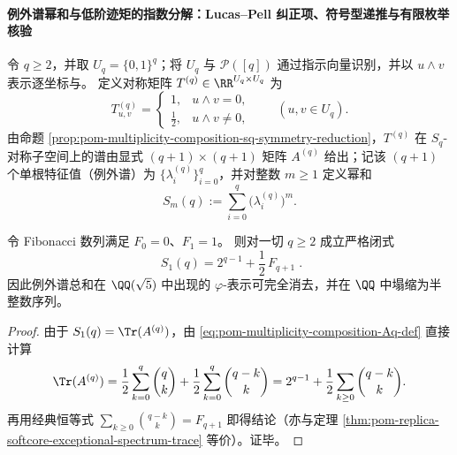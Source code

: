 \paragraph{例外谱幂和与低阶迹矩的指数分解：Lucas--Pell 纠正项、符号型递推与有限枚举核验}
令 \(q\ge 2\)，并取 \(U_q=\{0,1\}^q\)；将 \(U_q\) 与 \(\mathcal P([q])\) 通过指示向量识别，并以 \(u\wedge v\) 表示逐坐标与。
定义对称矩阵 \(T^{(q)}\in\RR^{U_q\times U_q}\) 为
\[
T^{(q)}_{u,v}=
\begin{cases}
1,&u\wedge v=0,\\[2pt]
\frac12,&u\wedge v\neq 0,
\end{cases}
\qquad (u,v\in U_q).
\]
由命题 \ref{prop:pom-multiplicity-composition-sq-symmetry-reduction}，\(T^{(q)}\) 在 \(S_q\)-对称子空间上的谱由显式 \((q+1)\times(q+1)\) 矩阵 \(A^{(q)}\) 给出；记该 \((q+1)\) 个单根特征值（例外谱）为 \(\{\lambda_i^{(q)}\}_{i=0}^{q}\)，并对整数 \(m\ge 1\) 定义幂和
\[
S_m(q):=\sum_{i=0}^{q}\big(\lambda_i^{(q)}\big)^m.
\]

\begin{conclusion}[例外谱一次幂和的整系数塌缩：\texorpdfstring{$S_1(q)=2^{q-1}+\frac12F_{q+1}$}{S1(q)=2^{q-1}+1/2 F_{q+1}}]\label{con:xi-terminal-replica-softcore-exceptional-power-sum-m1-integer-collapse}
令 Fibonacci 数列满足 \(F_0=0\)、\(F_1=1\)。
则对一切 \(q\ge 2\) 成立严格闭式
\[
\boxed{\;
S_1(q)=2^{q-1}+\frac12\,F_{q+1}\; }.
\]
因此例外谱总和在 \(\QQ(\sqrt5)\) 中出现的 \(\varphi\)-表示可完全消去，并在 \(\QQ\) 中塌缩为半整数序列。
\end{conclusion}
\begin{proof}
由于 \(S_1(q)=\Tr(A^{(q)})\)，由 \eqref{eq:pom-multiplicity-composition-Aq-def} 直接计算
\[
\Tr(A^{(q)})
=\frac12\sum_{k=0}^{q}\binom{q}{k}+\frac12\sum_{k=0}^{q}\binom{q-k}{k}
=2^{q-1}+\frac12\sum_{k\ge 0}\binom{q-k}{k}.
\]
再用经典恒等式 \(\sum_{k\ge 0}\binom{q-k}{k}=F_{q+1}\) 即得结论（亦与定理 \ref{thm:pom-replica-softcore-exceptional-spectrum-trace} 等价）。证毕。
\end{proof}

